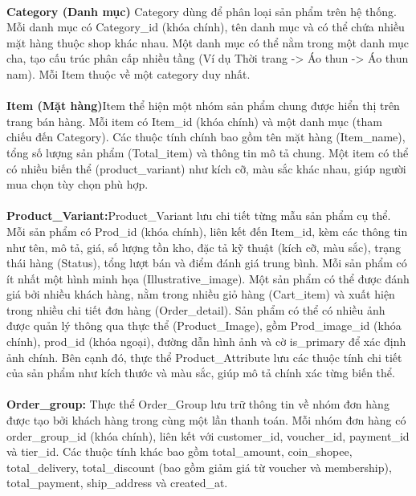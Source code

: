 \\
\hspace*{2em} \textbf{Category (Danh mục)} Category dùng để phân loại sản phẩm trên hệ thống. Mỗi danh mục có Category\_id (khóa chính), tên danh mục và có thể chứa nhiều mặt hàng thuộc shop khác nhau. Một danh mục có thể nằm trong một danh mục cha, tạo cấu trúc phân cấp nhiều tầng (Ví dụ Thời trang -> Áo thun -> Áo thun nam). Mỗi Item thuộc về một category duy nhất.\\ \\ 
\hspace*{2em} \textbf{Item (Mặt hàng)}Item thể hiện một nhóm sản phẩm chung được hiển thị trên trang bán hàng. 
Mỗi item có Item\_id (khóa chính) và một danh mục (tham chiếu đến Category). 
Các thuộc tính chính bao gồm tên mặt hàng (Item\_name), tổng số lượng sản phẩm (Total\_item) và thông tin mô tả chung. 
Một item có thể có nhiều biến thể (product\_variant) như kích cỡ, màu sắc khác nhau, 
giúp người mua chọn tùy chọn phù hợp. \\ \\ 
\hspace*{2em} \textbf{Product\_Variant:}Product\_Variant lưu chi tiết từng mẫu sản phẩm cụ thể. Mỗi sản phẩm có Prod\_id (khóa chính), 
liên kết đến Item\_id, kèm các thông tin như tên, mô tả, giá, số lượng tồn kho, đặc tả kỹ thuật (kích cỡ, màu sắc), 
trạng thái hàng (Status), tổng lượt bán và điểm đánh giá trung bình. Mỗi sản phẩm có ít nhất một hình minh họa (Illustrative\_image). 
Một sản phẩm có thể được đánh giá bởi nhiều khách hàng, nằm trong nhiều giỏ hàng (Cart\_item) và xuất hiện trong nhiều chi tiết đơn hàng (Order\_detail).
Sản phẩm có thể có nhiều ảnh được quản lý thông qua thực thể (Product\_Image), gồm Prod\_image\_id (khóa chính), prod\_id (khóa ngoại), đường dẫn hình ảnh và cờ is\_primary để xác định ảnh chính. Bên cạnh đó, 
thực thể Product\_Attribute lưu các thuộc tính chi tiết của sản phẩm như kích thước và màu sắc, giúp mô tả chính xác từng biến thể.
 \\ \\
\hspace*{2em} \textbf{Order\_group:} Thực thể Order\_Group lưu trữ thông tin về nhóm đơn hàng được tạo bởi khách hàng trong cùng một lần thanh toán. 
Mỗi nhóm đơn hàng có order\_group\_id (khóa chính), liên kết với customer\_id, voucher\_id, payment\_id và tier\_id. Các thuộc tính khác bao gồm total\_amount, coin\_shopee, total\_delivery, 
total\_discount (bao gồm giảm giá từ voucher và membership), total\_payment, ship\_address và created\_at.
